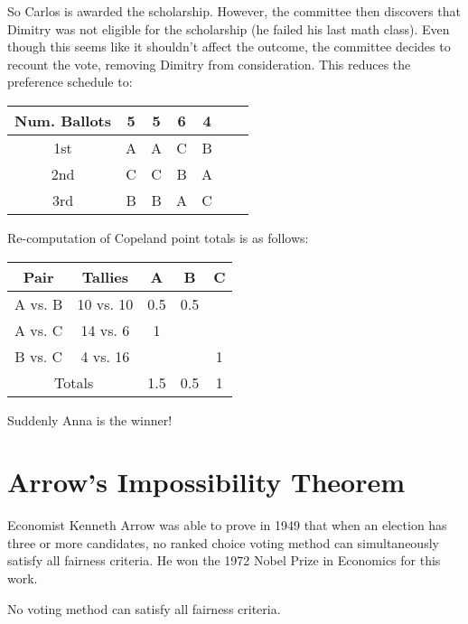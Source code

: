 \begin{example}
  So Carlos is awarded the scholarship. However, the committee then
  discovers that Dimitry was not eligible for the scholarship (he failed
  his last math class). Even though this seems like it shouldn't affect
  the outcome, the committee decides to recount the vote, removing
  Dimitry from consideration. This reduces the preference schedule to:
  \begin{center}
    \begin{tabular}[h]{ccccccc}
      \toprule
      Num. Ballots & 5 & 5 & 6 & 4 \\
      \midrule
      1st & A & A & C & B \\
      2nd & C & C & B & A \\
      3rd & B & B & A & C \\
      \bottomrule
    \end{tabular}
  \end{center}
  Re-computation of Copeland point totals is as follows:
  \begin{center}
    \begin{tabular}[h!]{ccccc}
      \toprule
      Pair & Tallies & A & B & C \\
      \toprule
      A vs. B & 10 vs. 10 & 0.5 & 0.5 & \\
      A vs. C & 14 vs. 6  &   1 &     & \\
      B vs. C & 4 vs. 16  &     &     & 1 \\
      \midrule
      \multicolumn{2}{c}{Totals} & 1.5 & 0.5 & 1 \\
      \bottomrule
    \end{tabular}
  \end{center}
  Suddenly Anna is the winner!
\end{example}

\newpage

\section{Arrow's Impossibility Theorem}%
\label{sec:arrows-impossibility-thm}

Economist Kenneth Arrow was able to prove in 1949 that when an
election has three or more candidates, no ranked choice voting method
can simultaneously satisfy all fairness criteria. He won the 1972
Nobel Prize in Economics for this work.

\begin{theorem}
No voting method can satisfy all fairness criteria.
\end{theorem}


